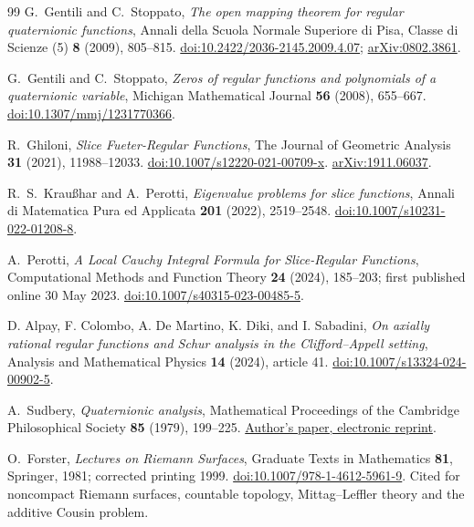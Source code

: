 \documentclass[11pt,a4paper]{article}
\numberwithin{equation}{section}
\theoremstyle{definition}
\theoremstyle{remark}
\theoremstyle{plain}
\begin{document}
\begin{thebibliography}{99}
G.~Gentili and C.~Stoppato, \emph{The open mapping theorem for regular quaternionic functions}, Annali della Scuola Normale Superiore di Pisa, Classe di Scienze (5) \textbf{8} (2009), 805--815. \href{https://doi.org/10.2422/2036-2145.2009.4.07}{doi:10.2422/2036-2145.2009.4.07}; \href{https://arxiv.org/abs/0802.3861}{arXiv:0802.3861}.

G.~Gentili and C.~Stoppato, \emph{Zeros of regular functions and polynomials of a quaternionic variable}, Michigan Mathematical Journal \textbf{56} (2008), 655--667. \href{https://doi.org/10.1307/mmj/1231770366}{doi:10.1307/mmj/1231770366}.

R.~Ghiloni, \emph{Slice Fueter-Regular Functions}, The Journal of Geometric Analysis \textbf{31} (2021), 11988--12033. \href{https://doi.org/10.1007/s12220-021-00709-x}{doi:10.1007/s12220-021-00709-x}. \href{https://arxiv.org/abs/1911.06037}{arXiv:1911.06037}.

R.~S.~Krau\ss har and A.~Perotti, \emph{Eigenvalue problems for slice functions}, Annali di Matematica Pura ed Applicata \textbf{201} (2022), 2519--2548. \href{https://doi.org/10.1007/s10231-022-01208-8}{doi:10.1007/s10231-022-01208-8}.

A.~Perotti, \emph{A Local Cauchy Integral Formula for Slice-Regular Functions}, Computational Methods and Function Theory \textbf{24} (2024), 185--203; first published online 30 May 2023. \href{https://doi.org/10.1007/s40315-023-00485-5}{doi:10.1007/s40315-023-00485-5}.

D. Alpay, F. Colombo, A. De Martino, K. Diki, and I. Sabadini, \emph{On axially rational regular functions and Schur analysis in the Clifford--Appell setting}, Analysis and Mathematical Physics \textbf{14} (2024), article 41. \href{https://doi.org/10.1007/s13324-024-00902-5}{doi:10.1007/s13324-024-00902-5}.

A.~Sudbery, \emph{Quaternionic analysis}, Mathematical Proceedings of the Cambridge Philosophical Society \textbf{85} (1979), 199--225. \href{https://dougsweetser.github.io/Q/Stuff/pdfs/Quaternionic-analysis.pdf}{Author's paper, electronic reprint}.

O.~Forster, \emph{Lectures on Riemann Surfaces}, Graduate Texts in Mathematics \textbf{81}, Springer, 1981; corrected printing 1999. \href{https://doi.org/10.1007/978-1-4612-5961-9}{doi:10.1007/978-1-4612-5961-9}. Cited for noncompact Riemann surfaces, countable topology, Mittag--Leffler theory and the additive Cousin problem.


\end{thebibliography}
\end{document}
